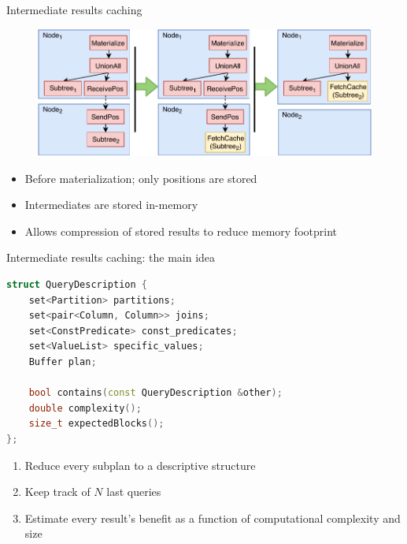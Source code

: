 \documentclass[compress, dvipsnames, unicode]{beamer}
\begin{document}
\begin{frame}{Intermediate results caching}
    \begin{figure}
        \centering
        \includegraphics[width=\textwidth]{images/caching_v2.pdf}
    \end{figure}
    \begin{itemize}
        \item Before materialization; only positions are stored
        \item Intermediates are stored in-memory
        \item Allows compression of stored results to reduce memory footprint
    \end{itemize}
\end{frame}

\begin{frame}[fragile]{Intermediate results caching: the main idea}
    \begin{lstlisting}[language=C++]
struct QueryDescription {
    set<Partition> partitions;
    set<pair<Column, Column>> joins;
    set<ConstPredicate> const_predicates;
    set<ValueList> specific_values;
    Buffer plan;

    bool contains(const QueryDescription &other);
    double complexity();
    size_t expectedBlocks();
};
    \end{lstlisting}
    \begin{enumerate}
        \item Reduce every subplan to a descriptive structure
        \item Keep track of $N$ last queries
        \item Estimate every result's benefit as a function of computational complexity and size
    \end{enumerate}
\end{frame}
\end{document}
